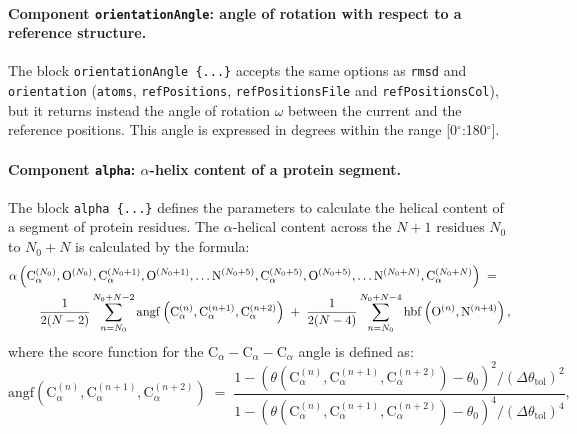 \paragraph*{Component \texttt{orientationAngle}: angle of rotation
  with respect to a reference structure.}  The block
\texttt{orientationAngle~\{...\}} accepts the same options as
\texttt{rmsd} and \texttt{orientation} (\texttt{atoms},
\texttt{refPositions}, \texttt{refPositionsFile} and
\texttt{refPositionsCol}), but it returns instead the angle of
rotation $\omega$ between the current and the reference positions.
This angle is expressed in degrees within the range
[0$^{\circ}$:180$^{\circ}$].


\paragraph*{Component \texttt{alpha}: $\alpha$-helix content of a
  protein segment.}  The block \texttt{alpha~\{...\}} defines the
parameters to calculate the helical content of a segment of protein
residues.  The $\alpha$-helical content across the $N+1$ residues
$N_{0}$ to $N_{0}+N$ is calculated by the formula:
\begin{eqnarray}
  \label{eq:colvars_alpha}
  { 
    \alpha\left(
      \mathrm{C}_{\alpha}^{(N_{0})},
      \mathrm{O}^{(N_{0})},
      \mathrm{C}_{\alpha}^{(N_{0}+1)},
      \mathrm{O}^{(N_{0}+1)},
      \ldots
      \mathrm{N}^{(N_{0}+5)},
      \mathrm{C}_{\alpha}^{(N_{0}+5)},
      \mathrm{O}^{(N_{0}+5)},
      \ldots
      \mathrm{N}^{(N_{0}+N)},
      \mathrm{C}_{\alpha}^{(N_{0}+N)}
    \right)
  } \; = \; \; \; \; \\ \; \; \; \; {
    \nonumber
    \frac{1}{2(N-2)} 
    \sum_{n=N_{0}}^{N_{0}+N-2}
    \mathrm{angf}\left(
        \mathrm{C}_{\alpha}^{(n)},
        \mathrm{C}_{\alpha}^{(n+1)},
        \mathrm{C}_{\alpha}^{(n+2)}\right)
  } \; + \; {
    \frac{1}{2(N-4)} 
    \sum_{n=N_{0}}^{N_{0}+N-4}
    \mathrm{hbf}\left(
      \mathrm{O}^{(n)},
      \mathrm{N}^{(n+4)}\right) \mathrm{,}
  } \\
\end{eqnarray}
where the score function for the $\mathrm{C}_{\alpha} -
\mathrm{C}_{\alpha} - \mathrm{C}_{\alpha}$ angle is defined as: 
\begin{equation}
  \label{eq:colvars_alpha_Calpha}
  {
    \mathrm{angf}\left(
      \mathrm{C}_{\alpha}^{(n)},
      \mathrm{C}_{\alpha}^{(n+1)},
      \mathrm{C}_{\alpha}^{(n+2)}\right)
  } \; = \; {
    \frac{1 - \left(\theta(
        \mathrm{C}_{\alpha}^{(n)},
        \mathrm{C}_{\alpha}^{(n+1)},
        \mathrm{C}_{\alpha}^{(n+2)}) -
        \theta_{0}\right)^{2} /
      \left(\Delta\theta_{\mathrm{tol}}\right)^{2}}{
      1 - \left(\theta(
        \mathrm{C}_{\alpha}^{(n)},
        \mathrm{C}_{\alpha}^{(n+1)},
        \mathrm{C}_{\alpha}^{(n+2)}) -
        \theta_{0}\right)^{4} /
      \left(\Delta\theta_{\mathrm{tol}}\right)^{4}} \mathrm{,}
  }
\end{equation}

